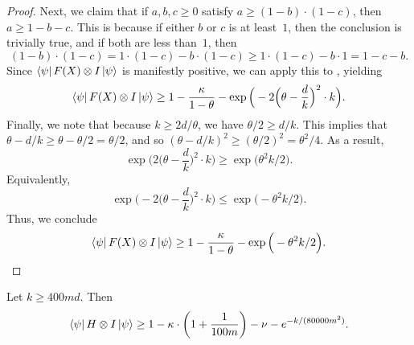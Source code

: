 \begin{proof}
    Next, we claim that if $a, b, c \geq 0$ satisfy $a \geq (1-b) \cdot (1-c)$,
    then $a \geq 1 - b - c$. This is because if either $b$ or $c$ is at least~$1$,
    then the conclusion is trivially true, and if both are less than~$1$,
    then
    \begin{equation*}
    (1-b) \cdot (1-c) = 1\cdot (1-c) -  b \cdot (1-c) \geq 1 \cdot (1-c) - b \cdot 1 = 1-c-b.
    \end{equation*}
    Since $\bra{\psi} F(X) \otimes I \ket{\psi}$ is manifestly positive,
    we can apply this to , yielding
    \begin{equation*}
    \bra{\psi} F(X) \otimes I \ket{\psi}
    \geq  1 - \frac{\kappa}{1 - \theta} - \exp \Big(-2\Big(\theta -
        \frac{d}{k}\Big)^2 \cdot k \Big).
    \end{equation*}
    Finally, we note that because $k \geq 2d/\theta$,
    we have $\theta/2 \geq d/k$.
    This implies that
    $\theta-d/k \geq \theta - \theta/2 = \theta/2$,
    and so    
    $(\theta - d/k)^2 \geq (\theta/2)^2 = \theta^2/4$.
    As a result,
    \begin{equation*}
    \exp \Big(2\Big(\theta -
        \frac{d}{k}\Big)^2 \cdot k \Big)
        \geq 
        \exp \Big(\theta^2 k/2 \Big).
    \end{equation*}
    Equivalently,
    \begin{equation*}
    \exp \Big(-2\Big(\theta -
        \frac{d}{k}\Big)^2 \cdot k \Big)
        \leq 
        \exp \Big(-\theta^2 k/2 \Big).
    \end{equation*}
    Thus, we conclude
    \begin{equation*}
     \bra{\psi} F(X) \otimes I \ket{\psi}
    \geq  1 - \frac{\kappa}{1 - \theta} - \exp \Big(-\theta^2 k/2 \Big).\qedhere
    \end{equation*}
  \end{proof}
\begin{corollary}
  \label{cor:ld-pasting-N-completeness}
  Let $k \geq 400md$. Then
  \[ \bra{\psi} H \otimes I \ket{\psi}
\geq 1 - \kappa \cdot \left(1 + \frac{1}{100m}\right)
    - \nu - e^{- k/(80000m^2)}. \]
\end{corollary}
